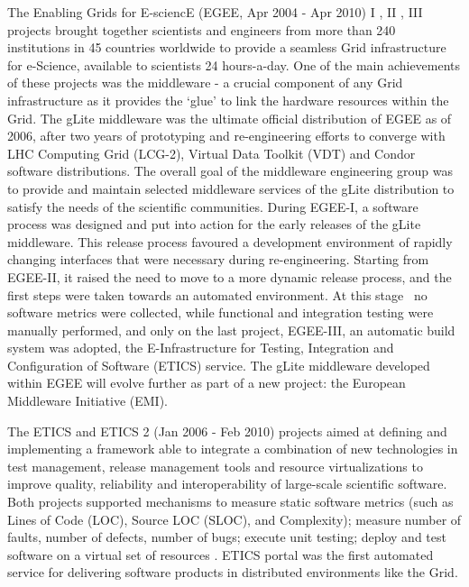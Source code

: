 \documentclass[journal]{IEEEtran}
\begin{document}
The Enabling Grids for E-sciencE (EGEE, Apr 2004 - Apr 2010) I \cite{cordis:egee}, II \cite{cordis:egee2}, III \cite{cordis:egee3} projects brought together scientists and engineers from more than 240 institutions in 45 countries worldwide to provide a seamless Grid infrastructure for e-Science, available to scientists 24 hours-a-day. One of the main achievements of these projects was the middleware - a crucial component of any Grid infrastructure as it provides the ‘glue’ to link the hardware resources within the Grid. The gLite middleware \cite{glite} was the ultimate official distribution of EGEE as of 2006, after two years of prototyping and re-engineering efforts to converge with LHC Computing Grid (LCG-2), Virtual Data Toolkit (VDT) and Condor \cite{condor} software distributions. The overall goal of the middleware engineering group was to provide and maintain selected middleware services of the gLite distribution to satisfy the needs of the scientific communities. During EGEE-I, a software process was designed and put into action for the early releases of the gLite middleware. This release process favoured a development environment of rapidly changing interfaces that were necessary during re-engineering. Starting from EGEE-II, it raised the need to move to a more dynamic release process, and the first steps were taken towards an automated environment. At this stage  no software metrics were collected, while functional and integration testing were manually performed, and only on the last project, EGEE-III, an automatic build system was adopted, the E-Infrastructure for Testing, Integration and Configuration of Software (ETICS) service. The gLite middleware developed within EGEE will evolve further as part of a new project: the European Middleware Initiative (EMI).

The ETICS \cite{cordis:etics} and ETICS 2 \cite{cordis:etics2} (Jan 2006 - Feb 2010) projects aimed at defining and implementing a framework able to integrate a combination of new technologies in test management, release management tools and resource virtualizations to improve quality, reliability and interoperability of large-scale scientific software. Both projects supported mechanisms to measure static software metrics (such as Lines of Code (LOC), Source LOC (SLOC), and Complexity); measure number of faults, number of defects, number of bugs; execute unit testing; deploy and test software on a virtual set of resources \cite{etics}. ETICS portal was the first automated service for delivering software products in distributed environments like the Grid.
\end{document}
